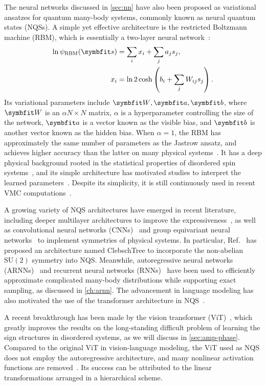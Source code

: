 The neural networks discussed in \cref{sec:nn} have also been proposed as variational ansatzes for quantum many-body systems, commonly known as neural quantum states (NQSs). A simple yet effective architecture is the restricted Boltzmann machine (RBM), which is essentially a two-layer neural network~\cite{carleo2017solving}:
\begin{align}
\ln \psi_\text{RBM}(\vs) &= \sum_i x_i + \sum_j a_j s_j, \\
x_i &= \ln 2 \cosh\left( b_i + \sum_j W_{i j} s_j \right).
\end{align}
Its variational parameters include $\mW, \va, \vb$, where $\mW$ is an $\alpha N \times N$ matrix, $\alpha$ is a hyperparameter controlling the size of the network, $\va$ is a vector known as the visible bias, and $\vb$ is another vector known as the hidden bias. When $\alpha = 1$, the RBM has approximately the same number of parameters as the Jastrow ansatz, and achieves higher accuracy than the latter on many physical systems~\cite{wu2023variational}. It has a deep physical background rooted in the statistical properties of disordered spin systems~\cite{sherrington1975solvable, hopfield1982neural}, and its simple architecture has motivated studies to interpret the learned parameters~\cite{abdollahi2016explainable, fernandez2023disentangling}. Despite its simplicity, it is still continuously used in recent VMC computations~\cite{nomura2017restricted, nomura2021dirac}.

A growing variety of NQS architectures have emerged in recent literature, including deeper multilayer architectures to improve the expressiveness~\cite{carleo2018constructing, sharir2022neural}, as well as convolutional neural networks (CNNs)~\cite{liang2018solving, choo2019two} and group equivariant neural networks~\cite{luo2021gauge, roth2021group} to implement symmetries of physical systems. In particular, Ref.~\cite{vieijra2021many} has proposed an architecture named ClebschTree to incorporate the non-abelian $\mathrm{SU}(2)$ symmetry into NQS. Meanwhile, autoregressive neural networks (ARNNs)~\cite{sharir2020deep} and recurrent neural networks (RNNs)~\cite{hibat2020recurrent, roth2020iterative} have been used to efficiently approximate complicated many-body distributions while supporting exact sampling, as discussed in \cref{ch:arnn}. The advancement in language modeling has also motivated the use of the transformer architecture in NQS~\cite{luo2021gauge, zhang2023transformer}.

A recent breakthrough has been made by the vision transformer (ViT)~\cite{viteritti2023transformer, viteritti2023transformer2, cao2024vision}, which greatly improves the results on the long-standing difficult problem of learning the sign structures in disordered systems, as we will discuss in \cref{sec:amp-phase}. Compared to the original ViT in vision-language modeling, the ViT used as NQS does not employ the autoregressive architecture, and many nonlinear activation functions are removed~\cite{rende2024queries}. Its success can be attributed to the linear transformations arranged in a hierarchical scheme.

